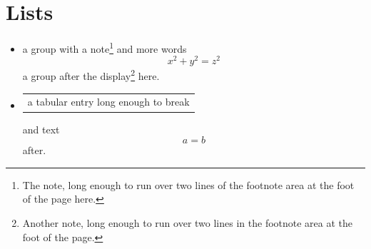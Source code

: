 \documentclass{article}
\begin{document}
\section{Lists}
\begin{itemize}
\item {\color{blue} a group with a note\footnote{The note, long enough to run over two lines of the footnote area at the foot of the page here.}} and more words
\[ x^2 + y^2 = z^2 \]
{\color{red} a group after the display\footnote{Another note, long enough to run over two lines in the footnote area at the foot of the page.}} here.
\item \begin{tabular}{p{2cm}}
a tabular entry long enough to break
\end{tabular} and text
\[ a = b \]
after.
\end{itemize}
\end{document}
